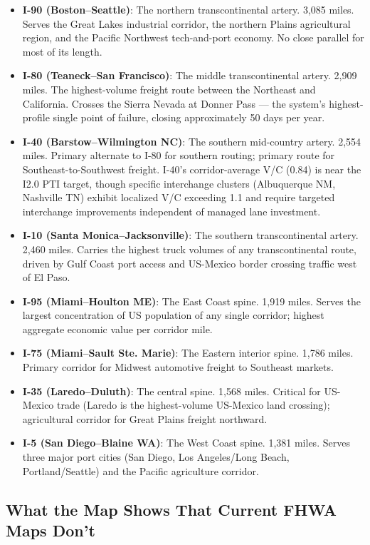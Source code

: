 \begin{itemize}
\item \textbf{I-90 (Boston--Seattle)}: The northern transcontinental artery. 3,085 miles. Serves the Great Lakes industrial corridor, the northern Plains agricultural region, and the Pacific Northwest tech-and-port economy. No close parallel for most of its length.
\item \textbf{I-80 (Teaneck--San Francisco)}: The middle transcontinental artery. 2,909 miles. The highest-volume freight route between the Northeast and California. Crosses the Sierra Nevada at Donner Pass --- the system's highest-profile single point of failure, closing approximately 50 days per year.
\item \textbf{I-40 (Barstow--Wilmington NC)}: The southern mid-country artery. 2,554 miles. Primary alternate to I-80 for southern routing; primary route for Southeast-to-Southwest freight. I-40's corridor-average V/C (0.84) is near the I2.0 PTI target, though specific interchange clusters (Albuquerque NM, Nashville TN) exhibit localized V/C exceeding 1.1 and require targeted interchange improvements independent of managed lane investment.
\item \textbf{I-10 (Santa Monica--Jacksonville)}: The southern transcontinental artery. 2,460 miles. Carries the highest truck volumes of any transcontinental route, driven by Gulf Coast port access and US-Mexico border crossing traffic west of El Paso.
\item \textbf{I-95 (Miami--Houlton ME)}: The East Coast spine. 1,919 miles. Serves the largest concentration of US population of any single corridor; highest aggregate economic value per corridor mile.
\item \textbf{I-75 (Miami--Sault Ste. Marie)}: The Eastern interior spine. 1,786 miles. Primary corridor for Midwest automotive freight to Southeast markets.
\item \textbf{I-35 (Laredo--Duluth)}: The central spine. 1,568 miles. Critical for US-Mexico trade (Laredo is the highest-volume US-Mexico land crossing); agricultural corridor for Great Plains freight northward.
\item \textbf{I-5 (San Diego--Blaine WA)}: The West Coast spine. 1,381 miles. Serves three major port cities (San Diego, Los Angeles/Long Beach, Portland/Seattle) and the Pacific agriculture corridor.
\end{itemize}

\subsection{What the Map Shows That Current FHWA Maps Don't}

